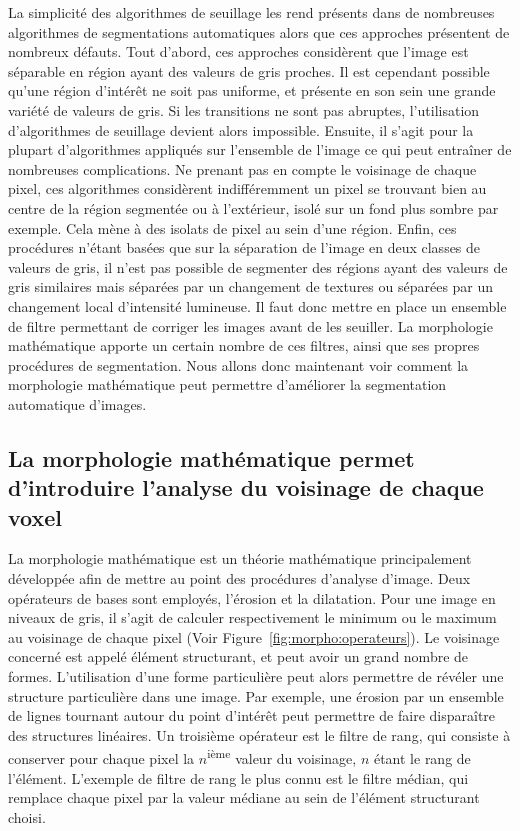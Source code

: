 \documentclass[\main/main.tex]{subfiles}
\begin{document}
%
La simplicité des algorithmes de seuillage les rend présents dans de nombreuses algorithmes de segmentations automatiques alors que  ces approches présentent de nombreux défauts.
%
Tout d'abord, ces approches considèrent que l'image est séparable en région ayant des valeurs de gris proches. Il est cependant possible qu'une région d'intérêt ne soit pas uniforme, et présente en son sein une grande variété de valeurs de gris. Si les transitions ne sont pas abruptes, l'utilisation d'algorithmes de seuillage devient alors impossible.
Ensuite, il s'agit pour la plupart d'algorithmes appliqués sur l'ensemble de l'image ce qui peut entraîner de nombreuses complications.
%
Ne prenant pas en compte le voisinage de chaque pixel, ces algorithmes considèrent indifféremment un pixel se trouvant bien au centre de la région segmentée ou à l'extérieur, isolé sur un fond plus sombre par exemple. Cela mène à des isolats de pixel au sein d'une région.
%
Enfin, ces procédures n'étant basées que sur la séparation de l'image en deux classes de valeurs de gris, il n'est pas possible de segmenter des régions ayant des valeurs de gris similaires mais séparées par un changement de textures ou séparées par un changement local d'intensité lumineuse.
Il faut donc mettre en place un ensemble de filtre permettant de corriger les images avant de les seuiller. La morphologie mathématique apporte un certain nombre de ces filtres, ainsi que ses propres procédures de segmentation.
%
Nous allons donc maintenant voir comment la morphologie mathématique peut permettre d'améliorer la segmentation automatique d'images.

    \subsection{La morphologie mathématique permet d'introduire l'analyse du voisinage de chaque voxel}
    
%
La morphologie mathématique est un théorie mathématique principalement développée afin de mettre au point des procédures d'analyse d'image.
%
Deux opérateurs de bases sont employés, l'érosion et la dilatation.
%
Pour une image en niveaux de gris, il s'agit de calculer respectivement le minimum ou le maximum au voisinage de chaque pixel (Voir Figure~\ref{fig:morpho:operateurs}).
%
Le voisinage concerné est appelé élément structurant, et peut avoir un grand nombre de formes.
%
L'utilisation d'une forme particulière peut alors permettre de révéler une structure particulière dans une image.
%
Par exemple, une érosion par un ensemble de lignes tournant autour du point d'intérêt peut permettre de faire disparaître des structures linéaires.
%
Un troisième opérateur est le filtre de rang, qui consiste à conserver pour chaque pixel la $n$\textsuperscript{ième} valeur du voisinage, $n$ étant le rang de l'élément.
%
L'exemple de filtre de rang le plus connu est le filtre médian, qui remplace chaque pixel par la valeur médiane au sein  de l'élément structurant choisi.
\end{document}
